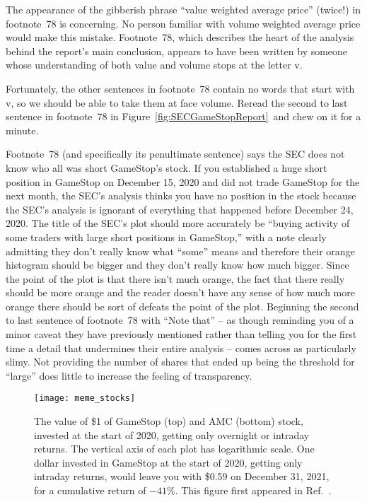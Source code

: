 \documentclass[twocolumn,twoside,prd,floatfix,letterpaper]{revtex4}
\def \lastDataDate {December 31, 2021}
\newcommand{\ldds}[1]{#1}  %
\def \FigSEC {Figure~\ref{fig:SECGameStopReport}}
\begin{document}
The appearance of the gibberish phrase ``value weighted average price'' (twice!) in footnote~78 is concerning.  No person familiar with volume weighted average price would make this mistake.  Footnote~78, which describes the heart of the analysis behind the report's main conclusion, appears to have been written by someone whose understanding of both value and volume stops at the letter v.

Fortunately, the other sentences in footnote~78 contain no words that start with v, so we should be able to take them at face volume.  Reread the second to last sentence in footnote~78 in \FigSEC\ and chew on it for a minute.

Footnote~78 (and specifically its penultimate sentence) says the SEC does not know who all was short GameStop's stock.  If you established a huge short position in GameStop on December 15, 2020 and did not trade GameStop for the next month, the SEC's analysis thinks you have no position in the stock because the SEC's analysis is ignorant of everything that happened before December 24, 2020.  The title of the SEC's plot should more accurately be ``buying activity of some traders with large short positions in GameStop,'' with a note clearly admitting they don't really know what ``some'' means and therefore their orange histogram should be bigger and they don't really know how much bigger.  Since the point of the plot is that there isn't much orange, the fact that there really should be more orange and the reader doesn't have any sense of how much more orange there should be sort of defeats the point of the plot.  Beginning the second to last sentence of footnote~78 with ``Note that'' -- as though reminding you of a minor caveat they have previously mentioned rather than telling you for the first time a detail that undermines their entire analysis -- comes across as particularly slimy.  Not providing the number of shares that ended up being the threshold for ``large'' does little to increase the feeling of transparency.

\begin{figure}[thb]
\texttt{[image: meme\_stocks]}
\caption[Overnight/intraday returns to meme stocks]{\label{fig:MemeStocks}The value of \$1 of GameStop (top) and AMC (bottom) stock, invested at the start of 2020, getting only overnight or intraday returns.  The vertical axis of each plot has logarithmic scale.  One dollar invested in GameStop at the start of 2020, getting only intraday returns, would leave you with \ldds{\$0.59} on \lastDataDate, for a cumulative return of \ldds{$-41\%$}.  This figure first appeared in Ref.~\cite{knuteson2021}.}
\end{figure}
\end{document}

